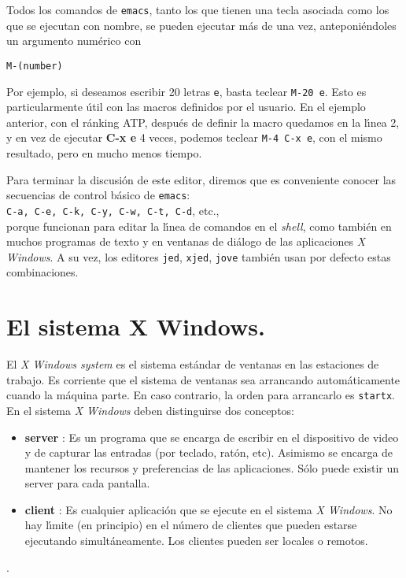 Todos los comandos de {\tt emacs}, tanto los que tienen una tecla
asociada como los que se ejecutan con nombre, se pueden ejecutar m\'as
de una vez, anteponi\'endoles un argumento num\'erico con
\begin{verbatim}
M-(number)
\end{verbatim}

 Por ejemplo, si deseamos escribir 20 letras
\verb+e+, basta teclear \verb+M-20 e+. Esto es particularmente \'util
con las macros definidos por el usuario. En el ejemplo anterior, con
el r\'anking ATP, despu\'es de definir la macro quedamos en la
l\'{\i}nea 2, y en vez de ejecutar {\bf C-x e} 4 veces, podemos
teclear \verb+M-4 C-x e+, con el mismo resultado, pero en mucho menos
tiempo.


\vspace{.3cm}

Para terminar la discusi\'on de este editor, diremos que es
conveniente 
conocer las secuencias de control b{\'a}sico de {\tt emacs}:\\
\verb+C-a, C-e, C-k, C-y, C-w, C-t, C-d+, etc.,\\
porque funcionan para editar la l{\'\i}nea de comandos en el {\it shell},
como tambi{\'e}n en muchos programas de texto y en ventanas de di{\'a}logo de
las aplicaciones {\it X Windows}. A su vez, los editores \verb+jed+,
\verb+xjed+, \verb+jove+ tambi{\'e}n usan por defecto estas combinaciones.


\section{El sistema X Windows.}

El {\it X Windows system} es el sistema est{\'a}ndar de ventanas en las
estaciones de trabajo. Es corriente que el sistema de ventanas sea
arrancando autom{\'a}ticamente cuando la m{\'a}quina parte. En caso
contrario, la orden para arrancarlo es \verb+startx+. En el sistema
{\it X Windows} deben distinguirse dos conceptos:

\begin {itemize}
  
\item {\bf server} : Es un programa que se encarga de escribir en el
  dispositivo de video y de capturar las entradas (por teclado,
  rat{\'o}n, etc). Asimismo se encarga de mantener los recursos y
  preferencias de las aplicaciones. S{\'o}lo puede existir un server para
  cada pantalla.
  
\item {\bf client} : Es cualquier aplicaci{\'o}n que se ejecute en el
  sistema {\it X Windows}.  No hay l{\'\i}mite (en principio) en el n{\'u}mero
  de clientes que pueden estarse ejecutando simult{\'a}neamente. Los
  clientes pueden ser locales o remotos.  
\end{itemize}.

